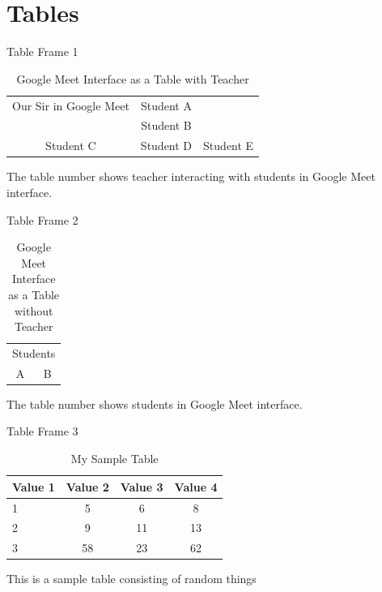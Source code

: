\documentclass{beamer}
\begin{document}
\section{Tables}

\begin{frame}{Table Frame 1}
    \begin{table}[h]
     \centering
      \begin{tabular}{c c c}
        \hline
        Our Sir in Google Meet  & Student A &   \pause \\
              & Student B &  \pause \\
        \hline
             Student C & Student D & Student E\\
        \hline
        \end{tabular}
\caption{ Google Meet Interface as a Table with Teacher}
\label{Table:}
 \end{table}
The table number shows teacher interacting with students in
Google Meet interface.
\end{frame}

\begin{frame}{Table Frame 2}
\begin{table}[h]
    \centering
    \begin{tabular}{c c}
    \hline
        \multicolumn{2}{c}{Students} \\
        A & B \\
        \hline
    \end{tabular}
    \caption{Google Meet Interface as a Table without Teacher}
    \label{tab:mylabel}
\end{table}
The table number shows students in Google Meet interface.
    
\end{frame}

\begin{frame}{Table Frame 3}
    \begin{table}[]
    \centering
     \caption{My Sample Table}
     \begin{tabular}{l|c|c|c}
\textbf{Value 1} &\textbf{Value 2}  & \textbf{Value 3} & \textbf{Value 4}\\ \hline
            1& 5 & 6 &8 \pause\\
            2 & 9  & 11 & 13  \pause\\
             3&  58 & 23  & 62\\
\end{tabular}
\label{tab:my_label}
\end{table}
\pause  
This is a sample table consisting of random things
\end{frame}
\end{document}
